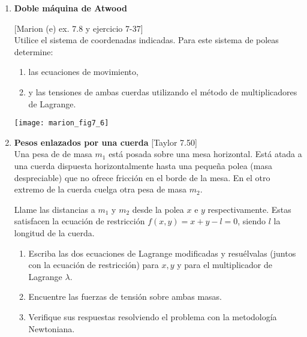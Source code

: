 \documentclass[11pt,spanish,a4paper]{article}
\begin{document}
\begin{enumerate}
	
\item
\begin{minipage}[t][8.5cm]{0.55\textwidth}
\textbf{Doble máquina de Atwood}

[Marion (e) ex. 7.8 y ejercicio 7-37]\\
Utilice el sistema de coordenadas indicadas.
Para este sistema de poleas determine: 
\begin{enumerate}
	\item las ecuaciones de movimiento,
	\item y las tensiones de ambas cuerdas utilizando el método de multiplicadores de Lagrange.
\end{enumerate}
\end{minipage}
\begin{minipage}[c][0.5cm][t]{0.4\textwidth}
	\texttt{[image: marion\_fig7\_6]}
\end{minipage}



\item 
\textbf{Pesos enlazados por una cuerda} [Taylor 7.50]\\
Una pesa de de masa \(m_1\) está posada sobre una mesa horizontal.
Está atada a una cuerda dispuesta horizontalmente hasta una pequeña polea (masa despreciable) que no ofrece fricción en el borde de la mesa.
En el otro extremo de la cuerda cuelga otra pesa de masa \(m_2\).

Llame las distancias a \(m_1\) y \(m_2\) desde la polea \(x\) e \(y\) respectivamente.
Estas satisfacen la ecuación de restricción \(f (x, y) = x + y -l = 0\), siendo \(l\) la longitud de la cuerda.
\begin{enumerate}
\item Escriba las dos ecuaciones de Lagrange modificadas y resuélvalas (juntos con la ecuación de restricción) para \(x, y\) y para el multiplicador de Lagrange \(\lambda\).
\item Encuentre las fuerzas de tensión sobre ambas masas.
\item Verifique sus respuestas resolviendo el problema con la metodología Newtoniana.
\end{enumerate}





\end{enumerate}
\end{document}
